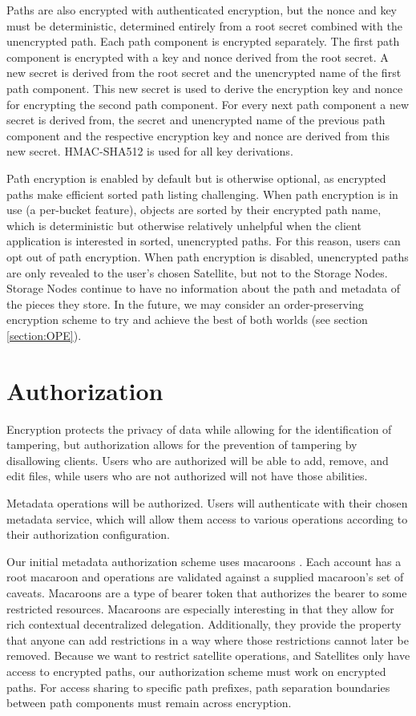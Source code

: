 \documentclass[8pt,fleqn,openany]{book}
\begin{document}
Paths are also encrypted with authenticated encryption, but the nonce and key
must be deterministic, determined entirely from a root secret combined with the
unencrypted path. Each path component is encrypted separately.
The first path component is encrypted with a key and nonce derived from the
root secret. A new secret is derived from the root secret and the unencrypted
name of the first path component. This new secret is used to derive the
encryption key and nonce for encrypting the second path component. For every
next path component a new secret is derived from, the secret and unencrypted
name of the previous path component and the respective encryption key and
nonce are derived from this new secret. HMAC-SHA512 is used for all key
derivations.

Path encryption is enabled by default but is otherwise optional, as encrypted
paths make efficient sorted path listing challenging.
When path encryption is in use (a per-bucket feature),
objects are sorted by their encrypted path name, which is deterministic
but otherwise relatively unhelpful
when the client application is interested in sorted, unencrypted paths.
For this reason, users can opt out of
path encryption. When path encryption is disabled, unencrypted paths
are only revealed to the user's chosen Satellite, but not to the Storage
Nodes. Storage Nodes continue to have no information about the path and
metadata of the pieces they store.
In the future, we may consider an order-preserving encryption scheme to try and
achieve the best of both worlds (see section \ref{section:OPE}).

\section{Authorization}\label{sec:concrete-authorization}

Encryption protects the privacy of data while allowing for the identification
of tampering, but authorization allows for the prevention of tampering by
disallowing clients. Users who are authorized will be able to add, remove,
and edit files, while users who are not authorized will not have those abilities.

Metadata operations will be authorized. Users will authenticate with
their chosen metadata service, which will allow them
access to various operations according to their authorization configuration.

Our initial metadata authorization scheme uses macaroons \cite{macaroons}.
Each account has a root macaroon and operations are validated against a supplied
macaroon's set of caveats. Macaroons are a type of bearer token that authorizes
the bearer to some restricted resources. Macaroons are especially interesting
in that they allow for rich contextual decentralized delegation. Additionally, they
provide the property that anyone can add restrictions in a way where those
restrictions cannot later be removed.
Because we want to restrict satellite operations, and Satellites only have access
to encrypted paths, our authorization scheme must work on encrypted paths. For
access sharing to specific path prefixes, path separation boundaries between
path components must remain across encryption.
\end{document}
